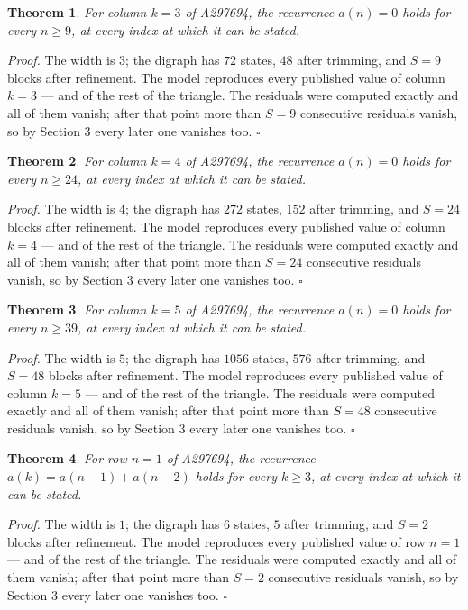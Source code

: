 \documentclass[11pt]{article}
\newtheorem{theorem}{Theorem}
\theoremstyle{definition}
\begin{document}
\begin{theorem} For column $k = 3$ of A297694, the recurrence $a(n) = 0$ holds for every $n \ge 9$, at every index at which it can be stated.\end{theorem}

{\itshape Proof.} The width is $3$; the digraph has $72$ states, $48$ after trimming, and $S = 9$ blocks after refinement. The model reproduces every published value of column $k = 3$ --- and of the rest of the triangle. The residuals were computed exactly and all of them vanish; after that point more than $S = 9$ consecutive residuals vanish, so by Section 3 every later one vanishes too. $\square$

\begin{theorem} For column $k = 4$ of A297694, the recurrence $a(n) = 0$ holds for every $n \ge 24$, at every index at which it can be stated.\end{theorem}

{\itshape Proof.} The width is $4$; the digraph has $272$ states, $152$ after trimming, and $S = 24$ blocks after refinement. The model reproduces every published value of column $k = 4$ --- and of the rest of the triangle. The residuals were computed exactly and all of them vanish; after that point more than $S = 24$ consecutive residuals vanish, so by Section 3 every later one vanishes too. $\square$

\begin{theorem} For column $k = 5$ of A297694, the recurrence $a(n) = 0$ holds for every $n \ge 39$, at every index at which it can be stated.\end{theorem}

{\itshape Proof.} The width is $5$; the digraph has $1056$ states, $576$ after trimming, and $S = 48$ blocks after refinement. The model reproduces every published value of column $k = 5$ --- and of the rest of the triangle. The residuals were computed exactly and all of them vanish; after that point more than $S = 48$ consecutive residuals vanish, so by Section 3 every later one vanishes too. $\square$

\begin{theorem} For row $n = 1$ of A297694, the recurrence $a(k) = a(n-1) + a(n-2)$ holds for every $k \ge 3$, at every index at which it can be stated.\end{theorem}

{\itshape Proof.} The width is $1$; the digraph has $6$ states, $5$ after trimming, and $S = 2$ blocks after refinement. The model reproduces every published value of row $n = 1$ --- and of the rest of the triangle. The residuals were computed exactly and all of them vanish; after that point more than $S = 2$ consecutive residuals vanish, so by Section 3 every later one vanishes too. $\square$
\end{document}
